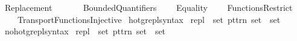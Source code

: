 %
\begin{isabellebody}%
%
%
\isadelimdocument
%
\endisadelimdocument
%
\isatagdocument
\isanewline
\isanewline
%
\isamarkuptrue%
%
\endisatagdocument
{\isafolddocument}%
%
\isadelimdocument
%
\endisadelimdocument
%
\isadelimtheory
%
\endisadelimtheory
%
\isatagtheory
{}\isamarkupfalse%
\ Replacement\isanewline
\ \ \isanewline
\ \ \ \ Bounded{\isacharunderscore}{\kern0pt}Quantifiers\isanewline
\ \ \ \ Equality\isanewline
\ \ \ \ Functions{\isacharunderscore}{\kern0pt}Restrict\isanewline
\ \ \ \ Transport{\isachardot}{\kern0pt}Functions{\isacharunderscore}{\kern0pt}Injective\isanewline
{}%
\endisatagtheory
{\isafoldtheory}%
%
\isadelimtheory
\isanewline
%
\endisadelimtheory
\isanewline
{}\isamarkupfalse%
\ hotg{\isacharunderscore}{\kern0pt}repl{\isacharunderscore}{\kern0pt}syntax\isanewline
{}\isanewline
{}\isamarkupfalse%
\ {\isachardoublequoteopen}{\isacharunderscore}{\kern0pt}repl{\isachardoublequoteclose}\ {\isacharcolon}{\kern0pt}{\isacharcolon}{\kern0pt}\ {\isacartoucheopen}{\isacharbrackleft}{\kern0pt}set{\isacharcomma}{\kern0pt}\ pttrn{\isacharcomma}{\kern0pt}\ set{\isacharbrackright}{\kern0pt}\ {\isacharequal}{\kern0pt}{\isachargreater}{\kern0pt}\ set{\isacartoucheclose}\ {\isacharparenleft}{\kern0pt}{\isachardoublequoteopen}{\isacharbraceleft}{\kern0pt}{\isacharunderscore}{\kern0pt}\ {\isacharbar}{\kern0pt}{\isacharslash}{\kern0pt}\ {\isacharunderscore}{\kern0pt}\ {\isasymin}\ {\isacharunderscore}{\kern0pt}{\isacharbraceright}{\kern0pt}{\isachardoublequoteclose}{\isacharparenright}{\kern0pt}\isanewline
{}\isamarkupfalse%
\isanewline
{}\isamarkupfalse%
\ no{\isacharunderscore}{\kern0pt}hotg{\isacharunderscore}{\kern0pt}repl{\isacharunderscore}{\kern0pt}syntax\isanewline
{}\isanewline
{}\isamarkupfalse%
\ {\isachardoublequoteopen}{\isacharunderscore}{\kern0pt}repl{\isachardoublequoteclose}\ {\isacharcolon}{\kern0pt}{\isacharcolon}{\kern0pt}\ {\isacartoucheopen}{\isacharbrackleft}{\kern0pt}set{\isacharcomma}{\kern0pt}\ pttrn{\isacharcomma}{\kern0pt}\ set{\isacharbrackright}{\kern0pt}\ {\isacharequal}{\kern0pt}{\isachargreater}{\kern0pt}\ set{\isacartoucheclose}\ {\isacharparenleft}{\kern0pt}{\isachardoublequoteopen}{\isacharbraceleft}{\kern0pt}{\isacharunderscore}{\kern0pt}\ {\isacharbar}{\kern0pt}{\isacharslash}{\kern0pt}\ {\isacharunderscore}{\kern0pt}\ {\isasymin}\ {\isacharunderscore}{\kern0pt}{\isacharbraceright}{\kern0pt}{\isachardoublequoteclose}{\isacharparenright}{\kern0pt}\isanewline

\end{isabellebody}
